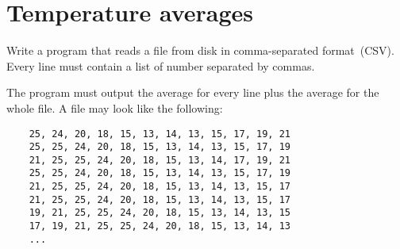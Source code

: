 \documentclass{article}
\begin{document}
\section{Temperature averages}
\label{sec:temperature-averages}

Write a program that reads a file from disk in comma-separated
format~(CSV). Every line must contain a list of number separated by
commas. 

The program must output the average for every line plus the average
for the whole file. A file may look like the following: 

\begin{verbatim}
    25, 24, 20, 18, 15, 13, 14, 13, 15, 17, 19, 21 
    25, 25, 24, 20, 18, 15, 13, 14, 13, 15, 17, 19 
    21, 25, 25, 24, 20, 18, 15, 13, 14, 17, 19, 21 
    25, 25, 24, 20, 18, 15, 13, 14, 13, 15, 17, 19 
    21, 25, 25, 24, 20, 18, 15, 13, 14, 13, 15, 17 
    21, 25, 25, 24, 20, 18, 15, 13, 14, 13, 15, 17 
    19, 21, 25, 25, 24, 20, 18, 15, 13, 14, 13, 15 
    17, 19, 21, 25, 25, 24, 20, 18, 15, 13, 14, 13
    ...
\end{verbatim}
\end{document}
